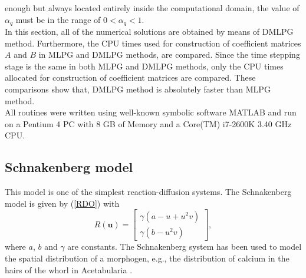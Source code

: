\documentclass[12pt]{article}
\numberwithin{equation}{section}
\begin{document}
enough but always located entirely inside the computational domain, the value of $\alpha_q$ must be in the range of $0<\alpha_q<1$.\\
In this section, all of the numerical solutions are obtained by means of DMLPG method. Furthermore, the CPU times used for construction of coefficient matrices $A$ and $B$ in MLPG and DMLPG methods, are compared. Since the time stepping stage is the same in both MLPG and DMLPG methods, only the CPU times allocated for construction of coefficient matrices are compared. These comparisons show that, DMLPG method is absolutely faster than
MLPG method.\\
All routines were written using well-known symbolic software MATLAB
and run on a Pentium 4 PC with 8
GB of Memory and a Core(TM) i7-2600K 3.40 GHz CPU.

\subsection{Schnakenberg model}
This model is one of the simplest reaction-diffusion systems. The Schnakenberg model \cite{Schnak} is given by (\ref{RDO}) with
\begin{equation}
R(\mathbf u) = \left[ \begin{array}{l}
\gamma (a - u + {u^2}v)\\
\gamma (b - {u^2}v)
\end{array} \right],\end{equation}
where $a$, $b$ and $\gamma$ are constants. The Schnakenberg system \cite{Schnak} has been used to model the spatial distribution of a morphogen, e.g., the distribution of calcium in the hairs of the whorl in Acetabularia \cite{Goodwin}.
\end{document}
